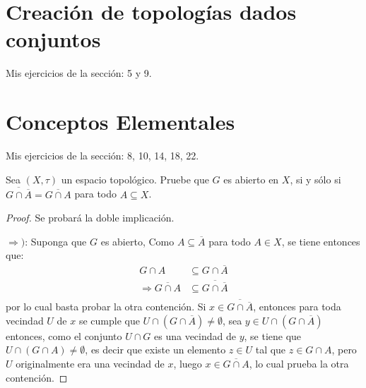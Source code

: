 \documentclass[12pt]{report}
\theoremstyle{largebreak}
\newcommand{\Cls}[1]{\ensuremath{\overline{#1}}}
\begin{document}
    \setcounter{section}{2}

    \newpage

    \section{Creación de topologías dados conjuntos}

    Mis ejercicios de la sección: 5 y 9.
    
    \begin{excer}
        
    \end{excer}

    \newpage

     \section{Conceptos Elementales}

     Mis ejercicios de la sección: 8, 10, 14, 18, 22.

    \setcounter{excer}{3}

     \begin{excer}
        Sea $(X,\tau)$ un espacio topológico. Pruebe que $G$ es abierto en $X$, si y sólo si $\Cls{G\cap\Cls{A}}=\Cls{G\cap A}$ para todo $A\subseteq X$.
     \end{excer}

    \begin{proof}
        Se probará la doble implicación.

        $\Rightarrow)$: Suponga que $G$ es abierto, Como $A\subseteq \Cls{A}$ para todo $A\in X$, se tiene entonces que:
        \begin{equation*}
            \begin{split}
                G\cap A&\subseteq G\cap \Cls{A}\\
                \Rightarrow \Cls{G\cap A}&\subseteq \Cls{G\cap \Cls{A}} \\
            \end{split}
        \end{equation*}
        por lo cual basta probar la otra contención. Si $x\in\Cls{G\cap \Cls{A}}$, entonces para toda vecindad $U$ de $x$ se cumple que $U\cap (G\cap \Cls{A})\neq\emptyset$, sea $y\in U\cap (G\cap \Cls{A})$ entonces, como el conjunto $U\cap G$ es una vecindad de $y$, se tiene que $U\cap (G\cap A)\neq\emptyset$, es decir que existe un elemento $z\in U$ tal que $z\in G\cap A$, pero $U$ originalmente era una vecindad de $x$, luego $x\in\Cls{G\cap A }$, lo cual prueba la otra contención.
    \end{proof}
\end{document}
